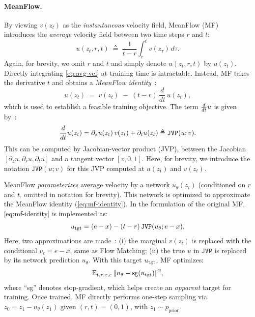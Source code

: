\paragraph{MeanFlow.}
By viewing $v(z_t)$ as the \textit{instantaneous} velocity field, MeanFlow (MF)~\cite{mf} introduces the \emph{average} velocity field between two time steps $r$ and $t$:
\begin{equation}
\label{eq:avg-vel}
u(z_t, r, t)\; \triangleq \;\frac{1}{t-r}\int_{r}^{t} v(z_\tau)\,d\tau.
\end{equation}
Again, for brevity, we omit $r$ and $t$ and simply denote $u(z_t, r, t)$ by $u(z_t)$. 
Directly integrating \cref{eq:avg-vel} at training time is intractable.
Instead, MF takes the derivative \wrt $t$ and obtains a \textit{MeanFlow identity}~\cite{mf}:
\begin{equation}
\label{eq:mf-identity}
u(z_t)\;=\;v(z_t)\;-\;(t-r)\,\frac{d}{dt}\,u(z_t),
\end{equation}
which is used to establish a feasible training objective.
The term $\frac{d}{d t} u$ is given by~\cite{mf}:
\begin{equation}
    \label{eq:total-deriv}
    \frac{d}{d t} u(z_t) = \partial_z u(z_t)\,v(z_t) + \partial_t u(z_t)
    \triangleq \mathtt{JVP}(u; v) .
\end{equation}
This can be computed by Jacobian-vector product (JVP), between the Jacobian $[\partial_z{u}, \partial_r{u}, \partial_t{u}]$ and a tangent vector $[v, 0, 1]$.
Here, for brevity, we introduce the notation $\mathtt{JVP}(u; v)$ for this JVP computed at $u(z_t)$ and $v(z_t)$.

MeanFlow \textit{parameterizes} average velocity by a network $u_\theta(z_t)$ (conditioned on $r$ and $t$, omitted in notation for brevity). This network is optimized to approximate the MeanFlow identity (\ref{eq:mf-identity}).
In the formulation of the original MF, \cref{eq:mf-identity} is implemented as:
\begin{equation}
\label{eq:u-tgt}
    u_\text{tgt} = (e-x) - (t-r)\,\mathtt{JVP}(u_\theta; e-x),
\end{equation}
Here, two approximations are made~\cite{mf}: (i) the marginal $v(z_t)$ is replaced with the conditional $v_c=e-x$, same as Flow Matching; (ii) the true $u$ in $\mathtt{JVP}$ is replaced by its network prediction $u_\theta$.
With this target $u_\text{tgt}$, MF optimizes: 
\begin{equation}
\label{eq:mf-loss}
\mathbb{E}_{t,r,x,e}\,\|u_\theta- \text{sg}(u_\text{tgt})\|^2,
\end{equation}
where ``sg'' denotes stop-gradient, which helps create an \emph{apparent} target for training.
Once trained, MF directly performs one-step sampling via $z_0 = z_1 - u_\theta(z_1)$ given $(r,t)=(0,1)$, with $z_1\sim p_{\text{prior}}$.